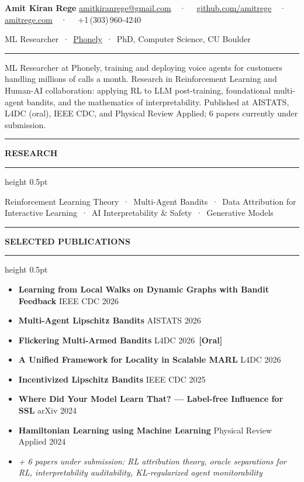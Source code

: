 \documentclass[10.5pt]{article}
\newcommand{\rezsec}[1]{%
  \vspace{8pt}%
  \noindent
  {\color{accent}\rule[-2pt]{2.4pt}{9pt}}%
  \hspace{5pt}%
  {\small\bfseries\color{navy}\MakeUppercase{#1}}%
  \hspace{6pt}%
  {\color{rule}\leaders\hrule height 0.5pt\hfill\kern0pt}%
  \vspace{2pt}\par%
}
\begin{document}

{\LARGE\bfseries\color{navy} Amit Kiran Rege}
\hfill
{\footnotesize\color{muted}
  \href{mailto:amitkiranrege@gmail.com}{amitkiranrege@gmail.com}~~·~~%
  \href{https://github.com/amitrege}{github.com/amitrege}~~·~~%
  \href{https://amitrege.com}{amitrege.com}~~·~~%
  +1\,(303)\,960-4240%
}\par\vspace{1pt}
{\small\color{muted} ML Researcher~·~\href{https://phonely.ai}{Phonely}~·~PhD, Computer Science, CU Boulder}

\vspace{2pt}
{\color{accent}\rule{\linewidth}{1.2pt}}

\vspace{3pt}
{\small ML Researcher at Phonely, training and deploying voice agents for customers handling millions of calls a month. Research in Reinforcement Learning and Human-AI collaboration: applying RL to LLM post-training, foundational multi-agent bandits, and the mathematics of interpretability.
Published at AISTATS, L4DC (oral), IEEE CDC, and Physical Review Applied; 6 papers currently under submission.}

\rezsec{Research}
{\small Reinforcement Learning Theory~·~Multi-Agent Bandits~·~Data Attribution for Interactive Learning~·~AI Interpretability \& Safety~·~Generative Models}

\rezsec{Selected Publications}
\begin{itemize}
  \item \textbf{Learning from Local Walks on Dynamic Graphs with Bandit Feedback} \hfill {\color{muted}\small IEEE CDC 2026}
  \item \textbf{Multi-Agent Lipschitz Bandits} \hfill {\color{muted}\small AISTATS 2026}
  \item \textbf{Flickering Multi-Armed Bandits} \hfill {\color{muted}\small L4DC 2026}~{\small\bfseries\color{accent}[Oral]}
  \item \textbf{A Unified Framework for Locality in Scalable MARL} \hfill {\color{muted}\small L4DC 2026}
  \item \textbf{Incentivized Lipschitz Bandits} \hfill {\color{muted}\small IEEE CDC 2025}
  \item \textbf{Where Did Your Model Learn That? — Label-free Influence for SSL} \hfill {\color{muted}\small arXiv 2024}
  \item \textbf{Hamiltonian Learning using Machine Learning} \hfill {\color{muted}\small Physical Review Applied 2024}
  \item {\color{muted}\small\itshape + 6 papers under submission: RL attribution theory, oracle separations for RL, interpretability auditability, KL-regularized agent monitorability}
\end{itemize}
\end{document}
